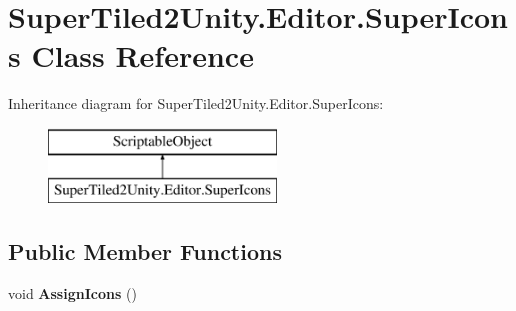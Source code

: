 \hypertarget{class_super_tiled2_unity_1_1_editor_1_1_super_icons}{}\section{Super\+Tiled2\+Unity.\+Editor.\+Super\+Icons Class Reference}
\label{class_super_tiled2_unity_1_1_editor_1_1_super_icons}
Inheritance diagram for Super\+Tiled2\+Unity.\+Editor.\+Super\+Icons\+:\begin{figure}[H]
\begin{center}
\leavevmode
\includegraphics[height=2.000000cm]{class_super_tiled2_unity_1_1_editor_1_1_super_icons}
\end{center}
\end{figure}
\subsection*{Public Member Functions}
\begin{DoxyCompactItemize}
\item 
\mbox{\label{class_super_tiled2_unity_1_1_editor_1_1_super_icons_ac0719017b60de232c454b777ce124785}} 
void {\bfseries Assign\+Icons} ()
\end{DoxyCompactItemize}
